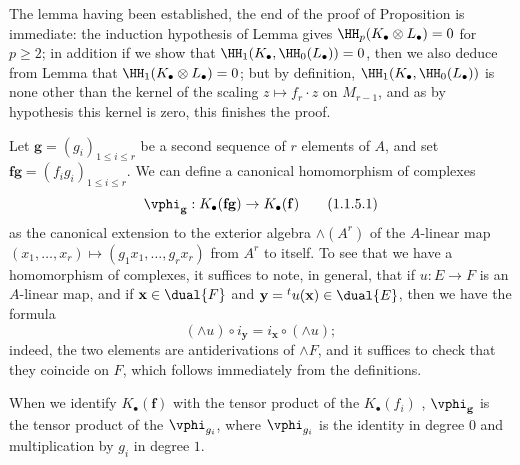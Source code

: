 The lemma having been established, the end of the proof of Proposition  is immediate: the induction hypothesis of Lemma  gives $\HH_p(K_\bullet\otimes L_\bullet)=0$ for $p\geq 2$; in addition if we show that $\HH_1(K_\bullet,\HH_0(L_\bullet))=0$, then we also deduce from Lemma  that $\HH_1(K_\bullet\otimes L_\bullet)=0$; but by definition, $\HH_1(K_\bullet,\HH_0(L_\bullet))$ is none other than the kernel of the scaling $z\mapsto f_r\cdot z$ on $M_{r-1}$, and as by hypothesis this kernel is zero, this finishes the proof.

\begin{env}[1.1.5]
\label{III.1.1.5}
Let $\mathbf{g}=(g_i)_{1\leq i\leq r}$ be a second sequence of $r$ elements of $A$, and set $\mathbf{f}\mathbf{g}=(f_i g_i)_{1\leq i\leq r}$.
We can define a canonical homomorphism of complexes
\[
  \vphi_\mathbf{g}:K_\bullet(\mathbf{f}\mathbf{g})\to K_\bullet(\mathbf{f})
  \tag{1.1.5.1}
\]
as the canonical extension to the exterior algebra $\wedge(A^r)$ of the $A$-linear map $(x_1,\dots,x_r)\mapsto(g_1 x_1,\dots,g_r x_r)$ from $A^r$ to itself.
To see that we have a homomorphism of complexes, it suffices to note, in general, that if $u:E\to F$ is an $A$-linear map, and if $\mathbf{x}\in\dual{F}$ and $\mathbf{y}={}^t u(\mathbf{x})\in\dual{E}$, then we have the formula
\[
  (\wedge u)\circ i_\mathbf{y}=i_\mathbf{x}\circ(\wedge u);
  \tag{1.1.5.2}
\]
indeed, the two elements are antiderivations of $\wedge F$, and it suffices to check that they coincide on $F$, which follows immediately from the definitions.

When we identify $K_\bullet(\mathbf{f})$ with the tensor product of the $K_\bullet(f_i)$ , $\vphi_\mathbf{g}$ is the tensor product of the $\vphi_{g_i}$, where $\vphi_{g_i}$ is the identity in degree $0$ and multiplication by $g_i$ in degree $1$.
\end{env}

